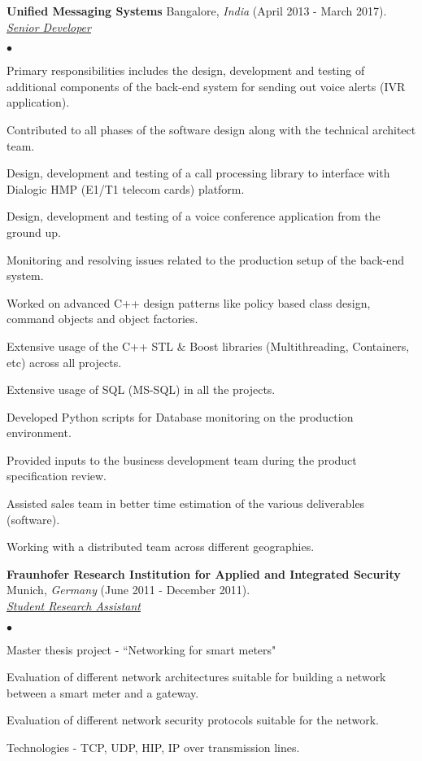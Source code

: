\documentclass[a4paper]{article}
\newcommand{\employer}[4]{{ \textbf{#1} #2  (#3).\\ \underline{\emph{#4}}\\  }}
\newenvironment{achievements}{\begin{list}{$\bullet$}{\topsep 0pt \itemsep -2pt}}{\vspace*{4pt}\end{list}}
\begin{document}
\employer{Unified Messaging Systems} {Bangalore, \textit{India}} {April 2013 - March 2017} {Senior Developer}
	\begin{achievements}
  \item Primary responsibilities includes the design, development and testing of additional components of the back-end system for sending out voice alerts (IVR application).
  \item Contributed to all phases of the software design along with the technical architect team.
    \item Design, development and testing of a call processing library to interface with Dialogic HMP (E1/T1 telecom cards) platform.
  \item Design, development and testing of a voice conference application from the ground up.
  \item Monitoring and resolving issues related to the production setup of the back-end system.
  \item Worked on advanced C++ design patterns like policy based class design, command objects and object factories.
  \item Extensive usage of the C++ STL \& Boost libraries (Multithreading, Containers, etc) across all projects.
  \item Extensive usage of SQL (MS-SQL) in all the projects.
  \item Developed Python scripts for Database monitoring on the production environment.
  \item Provided inputs to the business development team during the product specification review.
  \item Assisted sales team in better time estimation of the various deliverables (software).
  \item Working with a distributed team across different geographies.
	\end{achievements}

\employer{Fraunhofer Research Institution for Applied and Integrated Security} {Munich, \textit{Germany}} {June 2011 - December 2011}{Student Research Assistant}
	\begin{achievements}
	\item Master thesis project - ``Networking for smart meters"
	\item Evaluation of different network architectures suitable for building a network between a smart meter and a gateway.
	\item Evaluation of different network security protocols suitable for the network.
  \item Technologies - TCP, UDP, HIP, IP over transmission lines.
	\end{achievements}
\end{document}
